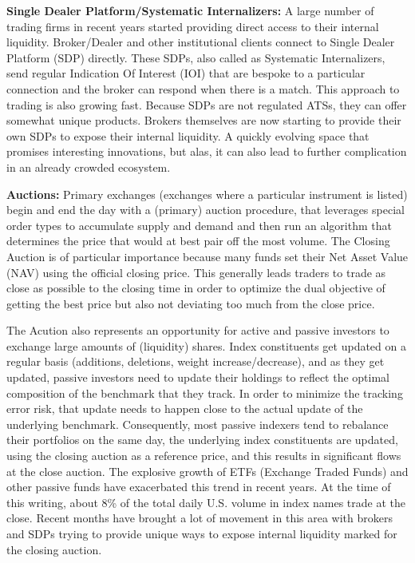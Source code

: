 \noindent\textbf{Single Dealer Platform/Systematic Internalizers:} A large number of trading firms in recent years started providing direct access to their internal liquidity. Broker/Dealer and other institutional clients connect to Single Dealer Platform (SDP) directly. These SDPs, also called as Systematic Internalizers, send regular Indication Of Interest (IOI) that are bespoke to a particular connection and the broker can respond when there is a match. This approach to trading is also growing fast. Because SDPs are not regulated ATSs, they can offer somewhat unique products. Brokers themselves are now starting to provide their own SDPs to expose their internal liquidity. A quickly evolving space that promises interesting innovations, but alas, it can also lead to further complication in an already crowded ecosystem. \twomedskip


\noindent\textbf{Auctions:} Primary exchanges (exchanges where a particular instrument is listed) begin and end the day with a (primary) auction procedure, that leverages special order types to accumulate supply and demand and then run an algorithm that determines the price that would at best pair off the most volume. The Closing Auction is of particular importance because many funds set their Net Asset Value (NAV) using the official closing price. This generally leads traders to trade as close as possible to the closing time in order to optimize the dual objective of getting the best price but also not deviating too much from the close price. 


The Acution also represents an opportunity for active and passive investors to exchange large amounts of (liquidity) shares. Index constituents get updated on a regular basis (additions, deletions, weight increase/decrease), and as they get updated, passive investors need to update their holdings to reflect the optimal composition of the benchmark that they track. In order to minimize the tracking error risk, that update needs to happen close to the actual update of the underlying benchmark. Consequently, most passive indexers tend to rebalance their portfolios on the same day, the underlying index constituents are updated, using the closing auction as a reference price, and this results in significant flows at the close auction. The explosive growth of ETFs (Exchange Traded Funds) and other passive funds have exacerbated this trend in recent years. At the time of this writing, about 8\% of the total daily U.S. volume in index names trade at the close. Recent months have brought a lot of movement in this area with brokers and SDPs trying to provide unique ways to expose internal liquidity marked for the closing auction. \twomedskip



